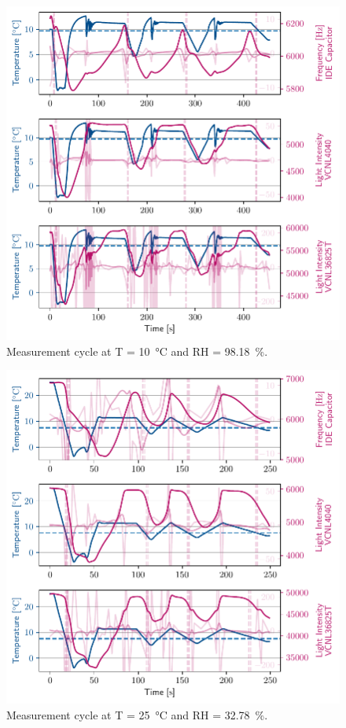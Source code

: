 \begin{figure}[ht]
    \centering
    \includegraphics{graphs/t10rh98.2.pdf}
    \caption{Measurement cycle at T = \qty{10}{\celsius} and RH = \qty{98.18}{\percent}.}
    
\end{figure}

\begin{figure}[ht]
    \centering
    \includegraphics{graphs/t25rh32.8.pdf}
    \caption{Measurement cycle at T = \qty{25}{\celsius} and RH = \qty{32.78}{\percent}.}
    
\end{figure}

